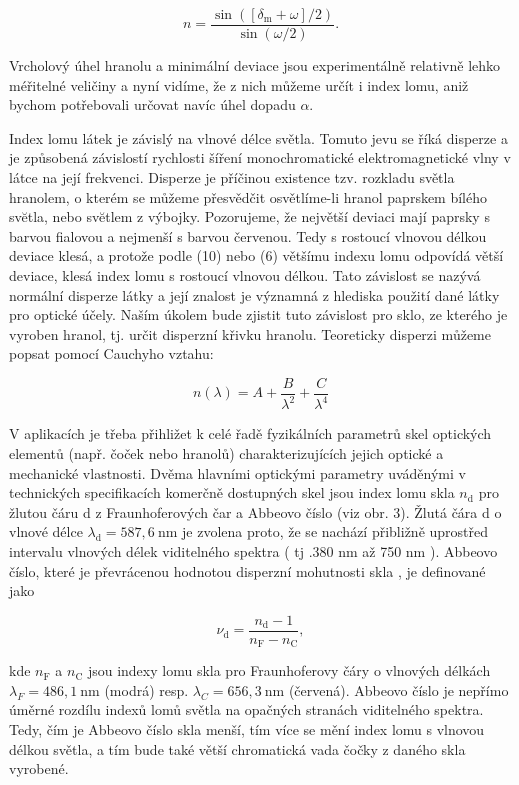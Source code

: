 \documentclass[czech,11pt,a4paper]{article}
\begin{document}
\begin{multicols}{2}
\begin{equation}
	n=\frac{\sin \left(\left[\delta_{\mathrm{m}}+\omega\right] / 2\right)}{\sin (\omega / 2)} .
\end{equation}


Vrcholový úhel hranolu a minimální deviace jsou experimentálně relativně lehko méřitelné veličiny a nyní vidíme, že z nich můžeme určít i index lomu, aniž bychom potřebovali určovat navíc úhel dopadu $\alpha$.

Index lomu látek je závislý na vlnové délce světla. Tomuto jevu se říká disperze a je způsobená závislostí rychlosti šíření monochromatické elektromagnetické vlny v látce na její frekvenci. Disperze je příčinou existence tzv. rozkladu světla hranolem, o kterém se můžeme přesvědčit osvětlíme-li hranol paprskem bílého svĕtla, nebo svĕtlem z výbojky. Pozorujeme, že největší deviaci mají paprsky s barvou fialovou a nejmenší s barvou červenou. Tedy s rostoucí vlnovou délkou deviace klesá, a protože podle (10) nebo (6) většímu indexu lomu odpovídá větší deviace, klesá index lomu s rostoucí vlnovou délkou. Tato závislost se nazývá normální disperze látky a její znalost je významná z hlediska použití dané látky pro optické účely. Naším úkolem bude zjistit tuto závislost pro sklo, ze kterého je vyroben hranol, tj. určit disperzní křivku hranolu. Teoreticky disperzi můžeme popsat pomocí Cauchyho vztahu:

\begin{equation}
	n(\lambda)=A+\frac{B}{\lambda^{2}}+\frac{C}{\lambda^{4}}
\end{equation}


V aplikacích je třeba přihližet k celé řadě fyzikálních parametrů skel optických elementů (např. čoček nebo hranolů) charakterizujících jejich optické a mechanické vlastnosti. Dvěma hlavními optickými parametry uváděnými v technických specifikacích komerčně dostupných skel jsou index lomu skla $n_{\mathrm{d}}$ pro žlutou čáru d z Fraunhoferových čar a Abbeovo číslo  (viz obr. 3). Žlutá čára d o vlnové délce $\lambda_{\mathrm{d}}=587,6 \mathrm{~nm}$ je zvolena proto, že se nachází přibližně uprostřed intervalu vlnových délek viditelného spektra ( tj .380 nm až 750 nm ). Abbeovo číslo, které je převrácenou hodnotou disperzní mohutnosti skla , je definované jako

\begin{equation}
	\nu_{\mathrm{d}}=\frac{n_{\mathrm{d}}-1}{n_{\mathrm{F}}-n_{\mathrm{C}}},
\end{equation}


kde $n_{\mathrm{F}}$ a $n_{\mathrm{C}}$ jsou indexy lomu skla pro Fraunhoferovy čáry o vlnových délkách $\lambda_{F}=486,1 \mathrm{~nm}$ (modrá) resp. $\lambda_{C}=656,3 \mathrm{~nm}$ (červená). Abbeovo číslo je nepřímo úměrné rozdílu indexů lomů světla na opačných stranách viditelného spektra. Tedy, čím je Abbeovo číslo skla menší, tím více se mění index lomu s vlnovou délkou světla, a tím bude také větší chromatická vada čočky z daného skla vyrobené.


\end{multicols}
\end{document}
